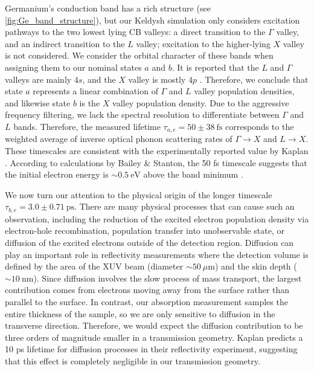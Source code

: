 Germanium's conduction band has a rich structure (see \cref{fig:Ge_band_structure}), but our Keldysh simulation only considers excitation pathways to the two lowest lying CB valleys: a direct transition to the $\Gamma$ valley, and an indirect transition to the $L$ valley; excitation to the higher-lying $X$ valley is not considered. We consider the orbital character of these bands when assigning them to our nominal states $a$ and $b$. It is reported that the $L$ and $\Gamma$ valleys are mainly $4s$, and the $X$ valley is mostly $4p$ \cite{zurchDirectSimultaneousObservation2017,kaplanFemtosecondTrackingCarrier2018}. Therefore, we conclude that state $a$ represents a linear combination of $\Gamma$ and $L$ valley population densities, and likewise state $b$ is the $X$ valley population density. Due to the aggressive frequency filtering, we lack the spectral resolution to differentiate between $\Gamma$ and $L$ bands. Therefore, the measured lifetime $\tau_{a,e} = 50 \pm 38 \ \textrm{fs}$ corresponds to the weighted average of inverse optical phonon scattering rates of $\Gamma \rightarrow X$ and $L \rightarrow X$. These timescales are consistent with the experimentally reported value by Kaplan \cite{kaplanFemtosecondTrackingCarrier2018}. According to calculations by Bailey \& Stanton, the 50 fs timescale suggests that the initial electron energy is $\sim 0.5 \ \textrm{eV}$ above the band minimum  \cite{baileyCalculationsFemtosecondDifferential1995}.

We now turn our attention to the physical origin of the longer timescale $\tau_{b,e} = 3.0 \pm 0.71 \ \textrm{ps}$. There are many physical processes that can cause such an observation, including the reduction of the excited electron population density via electron-hole recombination, population transfer into unobservable state, or diffusion of the excited electrons outside of the detection region. Diffusion can play an important role in reflectivity measurements where the detection volume is defined by the area of the XUV beam (diameter $\sim 50 \ \mu\textrm{m}$) and the skin depth ($\sim 10 \ \textrm{nm}$). Since diffusion involves the slow process of mass transport, the largest contribution comes from electrons moving away from the surface rather than parallel to the surface. In contrast, our absorption measurement samples the entire thickness of the sample, so we are only sensitive to diffusion in the transverse direction. Therefore, we would expect the diffusion contribution to be three orders of magnitude smaller in a transmission geometry. Kaplan predicts a 10 ps lifetime for diffusion processes in their reflectivity experiment, suggesting that this effect is completely negligible in our transmission geometry.


